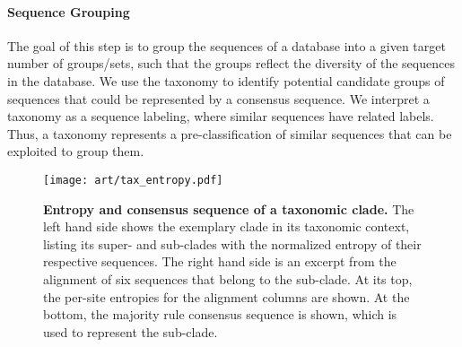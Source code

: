 \paragraph{Sequence Grouping}
\label{ch:AutomaticTrees:sec:Methods:sub:PhAT:par:SequenceGrouping}

The goal of this step is to group the sequences of a database into a given target number of groups/sets,
such that the groups reflect the diversity of the sequences in the database.
We use the taxonomy to identify potential candidate groups of sequences that could be represented by a consensus sequence.
We interpret a taxonomy as a sequence labeling, where similar sequences have related labels.
Thus, a taxonomy represents a pre-classification of similar sequences that can be exploited to group them.

\begin{figure}[hpbt]
    \centering
    \texttt{[image: art/tax\_entropy.pdf]}
    \caption[Entropy and consensus sequence of a taxonomic clade]{
        \textbf{Entropy and consensus sequence of a taxonomic clade.}
        The left hand side shows the exemplary clade  in its taxonomic context,
        listing its super- and sub-clades with the normalized entropy of their respective sequences.
        The right hand side is an excerpt from the alignment
        of six sequences that belong to the  sub-clade.
        At its top, the per-site entropies for the alignment columns are shown.
        At the bottom, the majority rule consensus sequence is shown, which is used to represent the sub-clade.
    }
    \label{fig:tax_entropy}
\end{figure}

